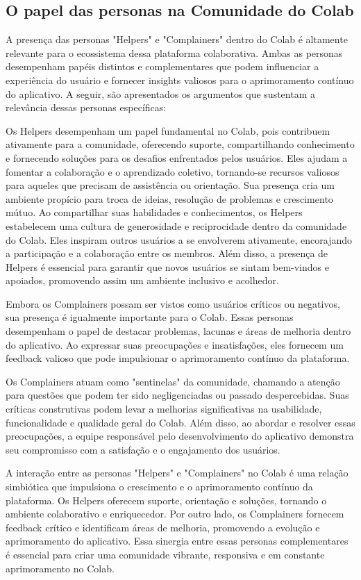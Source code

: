 \subsection*{O papel das personas na Comunidade do Colab}

A presença das personas "Helpers" e "Complainers" dentro do Colab é altamente relevante para o ecossistema dessa plataforma colaborativa. Ambas as personas desempenham papéis distintos e complementares que podem influenciar a experiência do usuário e fornecer insights valiosos para o aprimoramento contínuo do aplicativo. A seguir, são apresentados os argumentos que sustentam a relevância dessas personas específicas:

Os Helpers desempenham um papel fundamental no Colab, pois contribuem ativamente para a comunidade, oferecendo suporte, compartilhando conhecimento e fornecendo soluções para os desafios enfrentados pelos usuários. Eles ajudam a fomentar a colaboração e o aprendizado coletivo, tornando-se recursos valiosos para aqueles que precisam de assistência ou orientação. Sua presença cria um ambiente propício para troca de ideias, resolução de problemas e crescimento mútuo. Ao compartilhar suas habilidades e conhecimentos, os Helpers estabelecem uma cultura de generosidade e reciprocidade dentro da comunidade do Colab. Eles inspiram outros usuários a se envolverem ativamente, encorajando a participação e a colaboração entre os membros. Além disso, a presença de Helpers é essencial para garantir que novos usuários se sintam bem-vindos e apoiados, promovendo assim um ambiente inclusivo e acolhedor.

Embora os Complainers possam ser vistos como usuários críticos ou negativos, sua presença é igualmente importante para o Colab. Essas personas desempenham o papel de destacar problemas, lacunas e áreas de melhoria dentro do aplicativo. Ao expressar suas preocupações e insatisfações, eles fornecem um feedback valioso que pode impulsionar o aprimoramento contínuo da plataforma.

Os Complainers atuam como "sentinelas" da comunidade, chamando a atenção para questões que podem ter sido negligenciadas ou passado despercebidas. Suas críticas construtivas podem levar a melhorias significativas na usabilidade, funcionalidade e qualidade geral do Colab. Além disso, ao abordar e resolver essas preocupações, a equipe responsável pelo desenvolvimento do aplicativo demonstra seu compromisso com a satisfação e o engajamento dos usuários.

A interação entre as personas "Helpers" e "Complainers" no Colab é uma relação simbiótica que impulsiona o crescimento e o aprimoramento contínuo da plataforma. Os Helpers oferecem suporte, orientação e soluções, tornando o ambiente colaborativo e enriquecedor. Por outro lado, os Complainers fornecem feedback crítico e identificam áreas de melhoria, promovendo a evolução e aprimoramento do aplicativo. Essa sinergia entre essas personas complementares é essencial para criar uma comunidade vibrante, responsiva e em constante aprimoramento no Colab.

